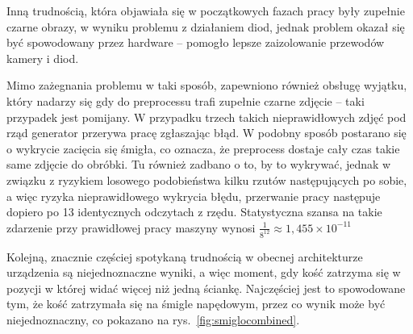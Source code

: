 Inną trudnością, która objawiała się w początkowych fazach pracy były zupełnie czarne obrazy,
w wyniku problemu z działaniem diod, jednak problem okazał się być spowodowany przez hardware --
pomogło lepsze zaizolowanie przewodów kamery i diod.

Mimo zażegnania problemu w taki sposób, zapewniono również obsługę wyjątku,
który nadarzy się gdy do preprocessu trafi zupełnie czarne zdjęcie -- taki przypadek jest pomijany.
W przypadku trzech takich nieprawidłowych zdjęć pod rząd generator przerywa pracę zgłaszając błąd.
W podobny sposób postarano się o wykrycie zacięcia się śmigła,
co oznacza, że preprocess dostaje cały czas takie same zdjęcie do obróbki.
Tu również zadbano o to, by to wykrywać, jednak w związku z ryzykiem losowego podobieństwa kilku rzutów następujących po sobie,
a więc ryzyka nieprawidłowego wykrycia błędu, %
przerwanie pracy następuje dopiero po 13 identycznych odczytach z rzędu.
Statystyczna szansa na takie zdarzenie przy prawidłowej pracy maszyny wynosi
$\frac{1}{8^{12}} \approx 1{,}455 \times 10^{-11}$


Kolejną, znacznie częściej spotykaną trudnością w obecnej architekturze urządzenia są niejednoznaczne wyniki,
a więc moment, gdy kość zatrzyma się w pozycji w której widać więcej niż jedną ściankę.
Najczęściej jest to spowodowane tym, że kość zatrzymała się na śmigle napędowym,
przez co wynik może być niejednoznaczny, co pokazano na rys.~\ref{fig:smiglocombined}.

